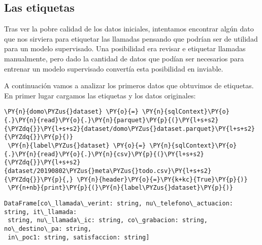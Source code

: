  
 \subsection{Las etiquetas}
 
 Tras ver la pobre calidad de los datos iniciales, intentamos encontrar algún dato que nos sirviera para etiquetar las llamadas pensando que podrían ser de utilidad para un modelo supervisado. Una posibilidad era revisar e etiquetar llamadas manualmente, pero dado la cantidad de datos que podían ser necesarios para entrenar un modelo supervisado convertía esta posibilidad en inviable.
 
 A continuación vamos a analizar los primeros datos que obtuvimos de etiquetas. En primer lugar cargamos las etiquetas y los datos originales:  
 \vspace{0.5cm}
 
   \begin{tcolorbox}[breakable, size=fbox, boxrule=1pt, pad at break*=1mm,colback=cellbackground, colframe=cellborder]
 \begin{Verbatim}[commandchars=\\\{\}]
 \PY{n}{domo\PYZus{}dataset} \PY{o}{=} \PY{n}{sqlContext}\PY{o}{.}\PY{n}{read}\PY{o}{.}\PY{n}{parquet}\PY{p}{(}\PY{l+s+s2}{\PYZdq{}}\PY{l+s+s2}{dataset/domo\PYZus{}dataset.parquet}\PY{l+s+s2}{\PYZdq{}}\PY{p}{)}
 \PY{n}{label\PYZus{}dataset} \PY{o}{=} \PY{n}{sqlContext}\PY{o}{.}\PY{n}{read}\PY{o}{.}\PY{n}{csv}\PY{p}{(}\PY{l+s+s2}{\PYZdq{}}\PY{l+s+s2}{dataset/20190802\PYZus{}meta\PYZus{}todo.csv}\PY{l+s+s2}{\PYZdq{}}\PY{p}{,} \PY{n}{header}\PY{o}{=}\PY{k+kc}{True}\PY{p}{)}
 \PY{n+nb}{print}\PY{p}{(}\PY{n}{label\PYZus{}dataset}\PY{p}{)}
 \end{Verbatim}
 \end{tcolorbox}
 
     \begin{Verbatim}[commandchars=\\\{\}]
 DataFrame[co\_llamada\_verint: string, nu\_telefono\_actuacion: string, it\_llamada:
 string, nu\_llamada\_ic: string, co\_grabacion: string, no\_destino\_pa: string,
 in\_poc1: string, satisfaccion: string]
     \end{Verbatim}
     

